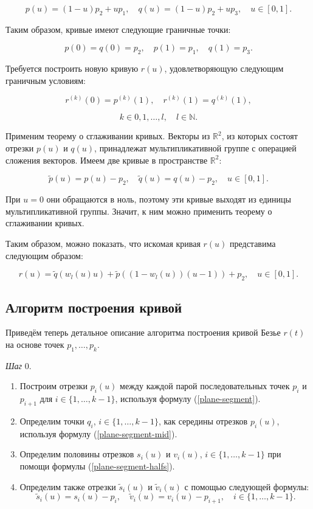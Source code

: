 $$
p(u)=(1-u)p_2+up_1, \quad q(u)=(1-u)p_2+up_3, \quad u \in [0,1].
$$

Таким образом, кривые имеют следующие граничные точки:

$$
p(0)=q(0)=p_2, \quad p(1)=p_1, \quad q(1)=p_3.
$$

Требуется построить новую кривую $r(u)$, удовлетворяющую следующим граничным условиям:

$$
r^{(k)}(0)=p^{(k)}(1), \quad r^{(k)}(1)=q^{(k)}(1),
$$

$$
k \in {0,1,\dots,l}, \quad l \in \mathbb{N}.
$$

Применим теорему о сглаживании кривых. Векторы из $\mathbb{R}^2$, из которых состоят отрезки $p(u)$ и $q(u)$,
принадлежат мультипликативной группе с операцией сложения векторов. Имеем две кривые в пространстве $\mathbb{R}^2$:

$$
\tilde p(u)=p(u)-p_2, \quad \tilde q(u)=q(u)-p_2, \quad u \in [0,1].
$$

При $u=0$ они обращаются в ноль, поэтому эти кривые выходят из единицы мультипликативной группы. Значит, к ним можно
применить теорему о сглаживании кривых.

Таким образом, можно показать, что искомая кривая $r(u)$ представима следующим образом:

$$
r(u)=\tilde q(w_l(u)u)+\tilde p((1-w_l(u))(u-1))+p_2, \quad u \in [0,1].
$$

\subsection*{Алгоритм построения кривой}

Приведём теперь детальное описание алгоритма построения кривой Безье $r(t)$ на основе точек $p_1,\dots,p_k$.

\bigskip
\textit{Шаг} 0.

\begin{enumerate}
\item Построим отрезки $p_i(u)$ между каждой парой последовательных точек $p_i$ и $p_{i+1}$ для
$i \in \{1,\dots,k-1\}$, используя формулу (\ref{plane-segment}).
\item Определим точки $q_i$, $i \in \{1,\dots,k-1\}$, как середины отрезков $p_i(u)$, используя формулу
(\ref{plane-segment-mid}).
\item Определим половины отрезков $s_i(u)$ и $v_i(u)$, $i \in \{1,\dots,k-1\}$ при помощи формулы
(\ref{plane-segment-halfs}).
\item Определим также отрезки $\tilde s_i(u)$ и $\tilde v_i(u)$ с помощью следующей формулы:
$$
\tilde s_i(u)=s_i(u)-p_i, \quad \tilde v_i(u)=v_i(u)-p_{i+1}, \quad i \in \{1,\dots,k-1\}.
$$
\end{enumerate}

